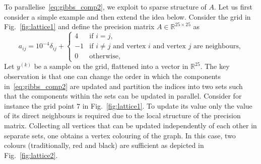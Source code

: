 \documentclass[
fontsize=11pt,
paper=a4,
numbers=noenddot
]{scrartcl}
\begin{document}
To parallelise~\eqref{eq:gibbs_comp2}, we exploit to sparse structure of $A$. Let us first consider a simple example and then extend the idea below. Consider the grid in Fig.~\ref{fig:lattice1} and define the precision matrix $A \in \mathbb{R}^{25 \times 25}$ as
\begin{equation*}
   a_{ij} = 
   10^{-4} \delta_{ij} + 
    \begin{cases}
        4 & \text{if $i = j$,} \\
        -1 &  \text{if $i \neq j$ and vertex $i$ and vertex $j$ are neighbours,} \\
        0 & \text{otherwise,}
    \end{cases}
\end{equation*} 
Let $y^{(k)}$ be a sample on the grid, flattened into a vector in $\mathbb{R}^{25}$. The key observation is that one can change the order in which the components in~\eqref{eq:gibbs_comp2} are updated and partition the indices into two sets such that the components within the sets can be updated in parallel. Consider for instance the grid point $7$ in Fig.~\ref{fig:lattice1}. To update its value only the value of its direct neighbours is required due to the local structure of the precision matrix. Collecting all vertices that can be updated independently of each other in separate sets, one obtains a vertex colouring of the graph. In this case, two colours (traditionally, red and black) are sufficient as depicted in Fig.~\ref{fig:lattice2}.
\end{document}
